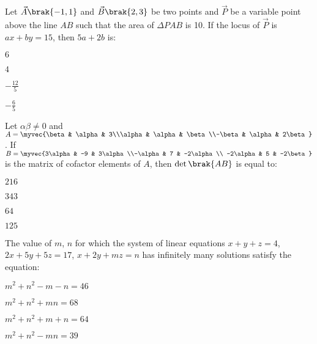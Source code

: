 \iffalse
\title{2024}
\author{EE24Btech11024}
\section{mcq-single}
\fi

\item Let $\vec{A}\brak{-1,1}$ and $\vec{B}\brak{2,3}$ be two points and $\vec{P}$ be a variable point above the line $AB$ such that the area of $\Delta PAB$ is 10. If the locus of $\vec{P}$ is $ax+by=15$, then $5a+2b$ is:

\hfill{}
\begin{enumerate}
\begin{multicols}{4}
\item $6$
\item $4$
\item $-\frac{12}{5}$
\item $-\frac{6}{5}$
\end{multicols}
\end{enumerate}

\item Let $\alpha\beta\neq 0$ and $A=\myvec{\beta & \alpha & 3\\\alpha & \alpha & \beta\\-\beta & \alpha & 2\beta}$. If $B=\myvec{3\alpha & -9 & 3\alpha\\-\alpha & 7 & -2\alpha \\ -2\alpha & 5 & -2\beta}$ is the matrix of cofactor elements of $A$, then $\det\brak{AB}$ is equal to:

\hfill{}
\begin{enumerate}
\begin{multicols}{4}
\item $216$
\item $343$
\item $64$
\item $125$
\end{multicols}
\end{enumerate}

\item The value of $m$, $n$ for which the system of linear equations \newline $x+y+z=4$, \newline $2x+5y+5z=17$, \newline $x+2y+mz=n$ \newline has infinitely many solutions satisfy the equation:

\hfill{}
\begin{enumerate}
\begin{multicols}{2}
\item $m^2+n^2-m-n=46$	
\item $m^2+n^2+mn=68$
\item $m^2+n^2+m+n=64$
\item $m^2+n^2-mn=39$
\end{multicols}
\end{enumerate}

